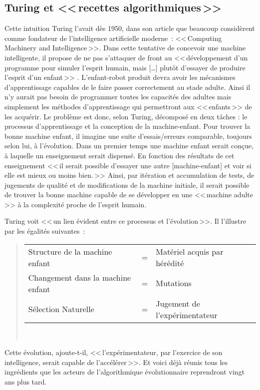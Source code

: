 \subsection*{Turing et <<\,recettes algorithmiques\,>>}
Cette intuition Turing l'avait dès 1950, dans son article que beaucoup considèrent comme fondateur de l'intelligence artificielle moderne~: <<\,Computing Machinery and Intelligence\,>>. Dans cette tentative de concevoir une machine intelligente, il propose de ne pas s'attaquer de front au <<\,développement d'un programme pour simuler l'esprit humain, mais [\ldots] plutôt d'essayer de produire l'esprit d'un enfant\,>> \citet[p. 456]{turing50computingmachineryintelligence}. L'enfant-robot produit devra avoir les mécanismes d'apprentissage capables de le faire passer correctement au stade adulte. Ainsi il n'y aurait pas besoin de programmer toutes les capacités des adultes mais simplement les méthodes d'apprentissage qui permettront aux <<\,enfants\,>> de les acquérir. Le problème est donc, selon Turing, décomposé en deux tâches : le processus d'apprentissage et la conception de la machine-enfant. Pour trouver la bonne \guillemotleft machine enfant\guillemotright, il imagine une suite d'essais/erreurs comparable, toujours selon lui, à l'évolution. Dans un premier temps une machine enfant serait conçue, à laquelle un enseignement serait dispensé. En fonction des résultats de cet enseignement <<\,il serait possible d'essayer une autre [machine-enfant] et voir si elle est mieux ou moins bien.\,>> Ainsi, par itération et accumulation de tests, de jugements de qualité et de modifications de la machine initiale, il serait possible de trouver la bonne machine capable de se développer en une <<\,machine adulte\,>> à la complexité proche de l'esprit humain.

Turing voit <<\,un lien évident entre ce processus et l'évolution\,>>. Il l'illustre par les égalités suivantes~:
\begin{quote}
   \begin{tabular}{lcl}
       Structure de la machine enfant & = &Matériel acquis par hérédité\\
       Changement dans la machine enfant&= & Mutations\\
       Sélection Naturelle &=& Jugement de l'expérimentateur\\
   \end{tabular}\\    
   \citep[p. 456]{turing50computingmachineryintelligence}
\end{quote}
Cette évolution, ajoute-t-il, <<\,l'expérimentateur, par l'exercice de son intelligence, serait capable de l'accélérer\,>>. Et voici déjà réunis tous les ingrédients que les acteurs de l'algorithmique évolutionnaire reprendront vingt ans plus tard.  

